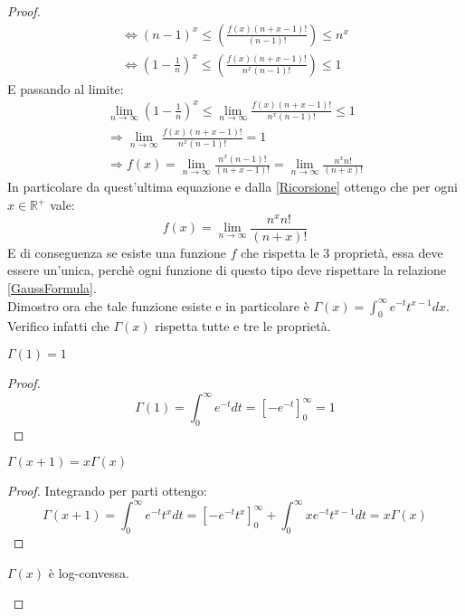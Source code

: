 \begin{proof}
\begin{gather*}
  \iff (n-1)^x \le \left( \frac{f(x)(n+x-1)!}{(n-1)!} \right) \le n^x \\
  \iff \left(1-\frac{1}{n}\right)^x \le \left( \frac{f(x)(n+x-1)!}{n^x(n-1)!} \right) \le 1
\end{gather*}
E passando al limite:
 \begin{gather*}
  \lim_{n\rightarrow \infty} \left(1-\frac{1}{n}\right)^x \le \lim_{n\rightarrow \infty}  \frac{f(x)(n+x-1)!}{n^x(n-1)!} \le 1 \\
  \Longrightarrow \lim_{n\rightarrow \infty} \frac{f(x)(n+x-1)!}{n^x(n-1)!}  = 1 \\
  \Longrightarrow f(x) = \lim_{n\rightarrow \infty} \frac{n^x(n-1)!}{(n+x-1)!}=\lim_{n\rightarrow \infty} \frac{n^xn!}{(n+x)!}
 \end{gather*}
In particolare da quest'ultima equazione e dalla \eqref{Ricorsione} ottengo che per ogni $x\in\mathbb{R}^+$ vale:
\begin{equation}
\label{GaussFormula}
 f(x)=\lim_{n\rightarrow \infty} \frac{n^xn!}{(n+x)!}
\end{equation}
E di conseguenza se esiste una funzione $f$ che rispetta le 3 proprietà, essa deve essere un'unica, perchè ogni
funzione di questo tipo deve rispettare la relazione \eqref{GaussFormula}.\\
Dimostro ora che tale funzione esiste e in particolare è 
$\Gamma(x)=\int_0^{\infty}{e^{-t}t^{x-1}dx}$. Verifico infatti che $\Gamma(x)$ rispetta tutte e tre le proprietà.
\begin{lemma}
 $\Gamma(1)=1$
\end{lemma}
\begin{proof}
       \begin{equation*}
       \Gamma(1)=\int_0^{\infty}{e^{-t}dt}=\left[-e^{-t}\right]_0^{\infty}=1
       \end{equation*}
\end{proof}
\begin{lemma}
 $\Gamma(x+1)=x\Gamma(x)$
\end{lemma}
\begin{proof}
       Integrando per parti ottengo:
       \begin{equation*} 
       \Gamma(x+1)=\int_0^{\infty}{e^{-t}t^xdt}=\left[-e^{-t}t^x\right]_0^{\infty}+\int_0^{\infty}xe^{-t}t^{x-1}dt=x\Gamma(x)
       \end{equation*}
\end{proof}
\begin{lemma}
 \label{GammaLogConvessa}
 $\Gamma(x)$ è log-convessa.
\end{lemma}

\end{proof}
